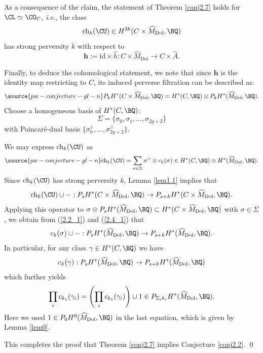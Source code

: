 



As a consequence of the claim, the statement of Theorem \ref{conj2.7} holds for $\CL \simeq \CO_C$, \emph{i.e.}, the class
\[
\mathrm{ch}_k(\CU) \in H^{2k}(C\times \widehat{M}_{\mathrm{Dol}}, \BQ)
\]
has strong perversity $k$ with respect to
\[
\mathbf{h}:= \mathrm{id} \times \widehat{h}: C\times \widehat{M}_{\mathrm{Dol}} \to C\times \widehat{A}.
\]



Finally, to deduce the cohomological statement, we note that since $\mathbf{h}$ is the identity map restricting to $C$, its induced perverse filtration can be described as:
\begin{equation}\label{2.2_1}
\source{pw-conjecture-gl-n}
P_kH^*(C \times \widehat{M}_{\mathrm{Dol}}, \BQ) = H^*(C, \BQ) \otimes P_kH^*(\widehat{M}_{\mathrm{Dol}}, \BQ).
\end{equation}
Choose a homogeneous basis of $H^*(C, \BQ)$:
\[
\Sigma=\{\sigma_0, \sigma_1, \dots, \sigma_{2g+2}\}
\]
with Poincar\'e-dual basis $\{\sigma^{\vee}_{0}, \dots, \sigma^\vee_{2g+2}\}$.

We may express $\mathrm{ch}_k(\CU)$ as
\begin{equation}\label{2.4_1}
\source{pw-conjecture-gl-n}
\mathrm{ch}_k(\CU) = \sum_{\sigma\in \Sigma} \sigma^\vee \otimes c_k(\sigma) \in H^*(C, \BQ) \otimes H^*(\widehat{M}_{\mathrm{Dol}}, \BQ).
\end{equation}
Since $\mathrm{ch}_k(\CU)$ has strong perversity $k$, Lemma \ref{lem1.1} implies that
\[
\mathrm{ch}_k(\CU) \cup - : P_sH^*(C\times \widehat{M}_{\mathrm{Dol}}, \BQ) \to P_{s+k}H^{*}(C\times \widehat{M}_{\mathrm{Dol}}, \BQ).
\]
Applying this operator to $\sigma \otimes P_sH^*(\widehat{M}_{\mathrm{Dol}}, \BQ) \subset H^*(C\times \widehat{M}_{\mathrm{Dol}}, \BQ)$ with $\sigma \in \Sigma$, we obtain from (\ref{2.2_1}) and (\ref{2.4_1}) that
\[
c_k(\sigma) \cup -: P_sH^*(\widehat{M}_{\mathrm{Dol}}, \BQ) \to P_{s+k}H^*(\widehat{M}_{\mathrm{Dol}}, \BQ).
\]
In particular, for any class $\gamma \in H^*(C, \BQ)$ we have
\[
c_k(\gamma): P_sH^*(\widehat{M}_{\mathrm{Dol}}, \BQ) \to P_{s+k}H^*(\widehat{M}_{\mathrm{Dol}}, \BQ)\]
which further yields
\[
\prod_ic_{k_1}(\gamma_i) = \left( \prod_ic_{k_1}(\gamma_i) \right) \cup 1 \in P_{\Sigma_ik_i}H^*(\widehat{M}_{\mathrm{Dol}}, \BQ).
 \]
 Here we used $1\in P_0H^0(\widehat{M}_{\mathrm{Dol}}, \BQ)$ in the last equation, which is given by Lemma \ref{lem0}.

This completes the proof that Theorem \ref{conj2.7} implies Conjecture \ref{conj2.2}. \qed
